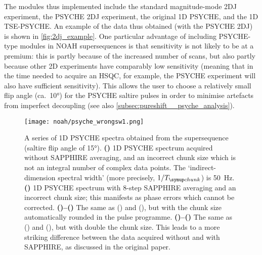 The modules thus implemented include the standard magnitude-mode 2DJ experiment, the PSYCHE 2DJ experiment\autocite{Foroozandeh2015CC}, the original 1D PSYCHE\autocite{Foroozandeh2014ACIE}, and the 1D TSE-PSYCHE\autocite{Foroozandeh2015CC}.
An example of the data thus obtained (with the PSYCHE 2DJ) is shown in \cref{fig:2dj_example}.
One particular advantage of including PSYCHE-type modules in NOAH supersequences is that sensitivity is not likely to be at a premium: this is partly because of the increased number of scans, but also partly because other 2D experiments have comparably low sensitivity (meaning that in the time needed to acquire an HSQC, for example, the PSYCHE experiment will also have sufficient sensitivity).
This allows the user to choose a relatively small flip angle (ca.\ \ang{10}) for the PSYCHE saltire pulses in order to minimise artefacts from imperfect decoupling (see also \cref{subsec:pureshift__psyche_analysis}).

\begin{figure}[!ht]
    \centering
    \texttt{[image: noah/psyche\_wrongsw1.png]}%
    {\label{fig:psyche_wrongsw1_bad_nosap}}%
    {\label{fig:psyche_wrongsw1_bad_sap}}%
    {\label{fig:psyche_wrongsw1_good_nosap}}%
    {\label{fig:psyche_wrongsw1_good_sap}}%
    {\label{fig:psyche_wrongsw1_good_nosap_25}}%
    {\label{fig:psyche_wrongsw1_good_sap_25}}%
    \caption[Effect of automatic chunk size calculation and SAPPHIRE averaging on NOAH PSYCHE spectra]{
        A series of 1D PSYCHE spectra obtained from the  supersequence (saltire flip angle of \ang{15}).
        \textbf{()} 1D PSYCHE spectrum acquired without SAPPHIRE averaging, and an incorrect chunk size which is not an integral number of complex data points. The `indirect-dimension spectral width' (more precisely, $1/\Tchunk$) is \qty{50}{\Hz}.
        \textbf{()} 1D PSYCHE spectrum with  8-step SAPPHIRE averaging and an incorrect chunk size; this manifests as phase errors which cannot be corrected.
        \textbf{()--()} The same as () and (), but with the chunk size automatically rounded in the pulse programme.
        \textbf{()--()} The same as () and (), but with double the chunk size.
        This leads to a more striking difference between the data acquired without and with SAPPHIRE, as discussed in the original paper\autocite{Moutzouri2017CC}.
    }
    \label{fig:psyche_wrongsw1}
\end{figure}

